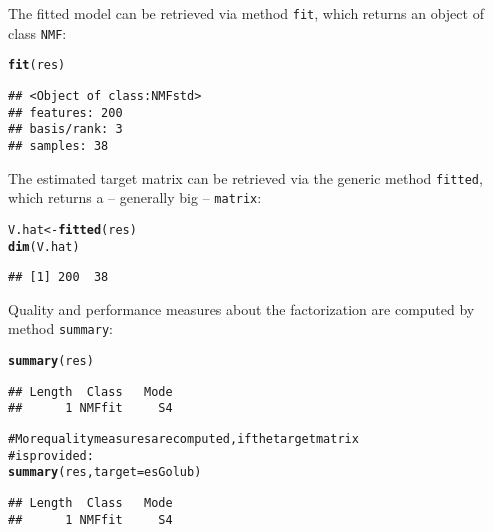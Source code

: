 \documentclass[a4paper]{article}\usepackage{graphicx, color}
\makeatletter
\newcommand{\hlfunctioncall}[1]{\textcolor[rgb]{0.501960784313725,0,0.329411764705882}{\textbf{#1}}}%
\newcommand{\hlcomment}[1]{\textcolor[rgb]{0.180392156862745,0.6,0.341176470588235}{#1}}%
\newenvironment{kframe}{%
 \def\at@end@of@kframe{}%
 \ifinner\ifhmode%
  \def\at@end@of@kframe{\end{minipage}}%
  \begin{minipage}{\columnwidth}%
 \fi\fi%
 \def\FrameCommand##1{\hskip\@totalleftmargin \hskip-\fboxsep
 \colorbox{shadecolor}{##1}\hskip-\fboxsep
     \hskip-\linewidth \hskip-\@totalleftmargin \hskip\columnwidth}%
 \MakeFramed {\advance\hsize-\width
   \@totalleftmargin\z@ \linewidth\hsize
   \@setminipage}}%
 {\par\unskip\endMakeFramed%
 \at@end@of@kframe}
\newenvironment{knitrout}{}{} %
\let\code=\texttt
\makeatother
\begin{document}
The fitted model can be retrieved via method \code{fit}, which returns an object of class \code{NMF}:

\begin{knitrout}
\color{fgcolor}\begin{kframe}
\begin{alltt}
\hlfunctioncall{fit}(res)
\end{alltt}
\begin{verbatim}
## <Object of class:NMFstd>
## features: 200 
## basis/rank: 3 
## samples: 38
\end{verbatim}
\end{kframe}
\end{knitrout}


The estimated target matrix can be retrieved via the generic method \code{fitted}, which returns a -- generally big -- \code{matrix}:

\begin{knitrout}
\color{fgcolor}\begin{kframe}
\begin{alltt}
V.hat <- \hlfunctioncall{fitted}(res)
\hlfunctioncall{dim}(V.hat)
\end{alltt}
\begin{verbatim}
## [1] 200  38
\end{verbatim}
\end{kframe}
\end{knitrout}


Quality and performance measures about the factorization are computed by method \code{summary}:

\begin{knitrout}
\color{fgcolor}\begin{kframe}
\begin{alltt}
\hlfunctioncall{summary}(res)
\end{alltt}
\begin{verbatim}
## Length  Class   Mode 
##      1 NMFfit     S4
\end{verbatim}
\begin{alltt}

\hlcomment{# More quality measures are computed, if the target matrix}
\hlcomment{# is provided:}
\hlfunctioncall{summary}(res, target = esGolub)
\end{alltt}
\begin{verbatim}
## Length  Class   Mode 
##      1 NMFfit     S4
\end{verbatim}
\end{kframe}
\end{knitrout}
\end{document}

